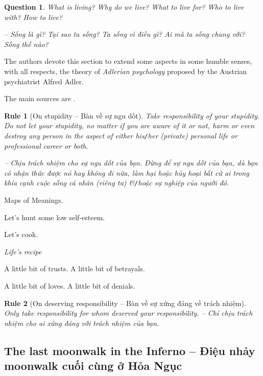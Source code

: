 \documentclass[12pt]{article}
\newtheorem{question}{Question}
\newtheorem{Rule}{Rule}
\begin{document}
\begin{question}
	What is living? Why do we live? What to live for? Who to live with? How to live?
	
	-- Sống là gì? Tại sao ta sống? Ta sống vì điều gì? Ai mà ta sống chung với? Sống thế nào?
\end{question}
The authors devote this section to extend some aspects in some humble senses, with all respects, the theory of {\it Adlerian psychology} proposed by the Austrian psychiatrist {\sc Alfred Adler}.

The main sources are \cite{Adler2013}.

\begin{Rule}[On stupidity -- Bàn về sự ngu dốt]
	Take responsibility of your stupidity. Do not let your stupidity, no matter if you are aware of it or not, harm or even destroy any person in the aspect of either his{\tt/}her (private) personal life or professional career or both.
	
	-- Chịu trách nhiệm cho sự ngu dốt của bạn. Đừng để sự ngu dốt của bạn, dù bạn có nhận thức được nó hay không đi nữa, làm hại hoặc hủy hoại bất cứ ai trong khía cạnh cuộc sống cá nhân (riêng tư) \&{\tt/}hoặc sự nghiệp của người đó.
\end{Rule}


Maps of Meanings.

Let's hunt some low self-esteem.

Let's cook.

\begin{center}\it
	{\sc Life's recipe}
	
	A little bit of trusts. A little bit of betrayals.
	
	A little bit of loves. A little bit of denials.
\end{center}


\begin{Rule}[On deserving responsibility -- Bàn về sự xứng đáng về trách nhiệm] 
	Only take responsibility for whom deserved your responsibility. -- Chỉ chịu trách nhiệm cho ai xứng đáng với trách nhiệm của bạn.
\end{Rule}

\subsection{The last moonwalk in the Inferno -- Điệu nhảy moonwalk cuối cùng ở Hỏa Ngục}

\end{document}
